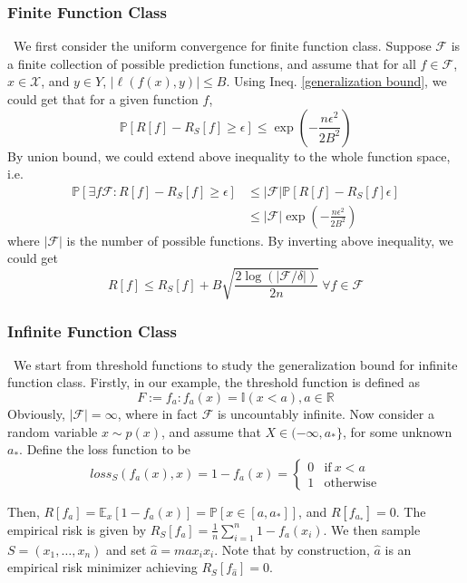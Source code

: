 \documentclass{article}[12pt]
\begin{document}
\subsubsection{Finite Function Class}
\
\indent We first consider the uniform convergence for finite function class. Suppose $\mathcal{F}$ is a finite collection of possible prediction functions, and assume that for all $f \in \mathcal{F}$, $x \in \mathcal{X}$, and $y \in Y$, $|\ell(f(x),y)| \leq B$. Using Ineq. \ref{generalization bound}, we could get that for a given function $f$, 
\begin{equation*}
    \mathbb{P}[R[f]-R_S[f]\geq \epsilon] \leq \exp{(-\frac{n\epsilon^2}{2B^2})} 
\end{equation*}By union bound, we could extend above inequality to the whole function space, i.e.
\begin{align}
    \mathbb{P}[\exists f \mathcal{F} : R[f]-R_S[f] \geq \epsilon] &\leq |\mathcal{F}| \mathbb{P}[R[f]-R_S[f]\epsilon]\\ &\leq |\mathcal{F}| \exp{(-\frac{n\epsilon^2}{2B^2})} 
\end{align}where $|\mathcal{F}|$ is the number of possible functions. By inverting above inequality, we could get 
\begin{equation*}
    R[f] \leq R_S[f] + B\sqrt{\frac{2\log(|\mathcal{F}/\delta|)}{2n}} \ \forall f \in \mathcal{F}
\end{equation*}

\subsubsection{Infinite Function Class}
\
\indent We start from threshold functions to study the generalization bound for infinite function class. Firstly, in our example, the threshold function is defined as 
\begin{equation*}
    F := {f_a: f_a(x) = \mathbb{I}(x<a), a \in \mathbb{R}}
\end{equation*}
Obviously, $|\mathcal{F}| = \infty$, where in fact $\mathcal{F}$ is uncountably infinite. Now consider a random variable $x \sim p(x)$, and assume that $X \in (-\infty, a_*\}$, for some unknown $a_*$. Define the loss function to be
$$
loss_S(f_a(x),x) = 1-f_a(x)=\left\{ \begin{array}{rcl}
0 
& \text{if} \ x < a \\ 1 & \text{otherwise}
\end{array}\right.
$$

Then, $R[f_a]=\mathbb{E}_x[1-f_a(x)] = \mathbb{P}[x \in [a, a_*]]$, and $R[f_{a_*}]=0$. The empirical risk is given by $R_S[f_a] = \frac{1}{n}\sum_{i=1}^n 1-f_a(x_i)$. We then sample $S=(x_1, \ldots, x_n)$ and set $\hat a=max_i x_i$. Note that by construction, $\hat a$ is an empirical risk minimizer achieving $R_S[f_{\hat a}]=0$.
\end{document}
